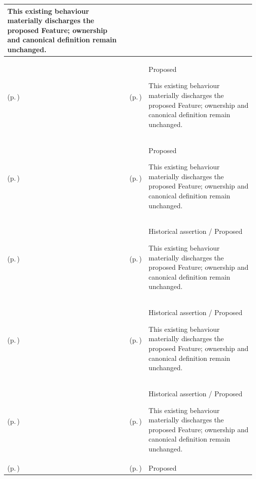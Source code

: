 \begin{longtable}{|>{\raggedright\arraybackslash}p{0.27\TableWidth}|>{\raggedright\arraybackslash}p{0.27\TableWidth}|>{\raggedright\arraybackslash}p{0.46\TableWidth}|}
This existing behaviour materially discharges the proposed Feature; ownership and canonical definition remain unchanged.\\\hline
\nameref{function:design-service-assurance} (p.\,\pageref{function:design-service-assurance}) & \nameref{feature:assurance-disposition-design-modelling} (p.\,\pageref{feature:assurance-disposition-design-modelling}) & Proposed

This existing behaviour materially discharges the proposed Feature; ownership and canonical definition remain unchanged.\\\hline
\nameref{function:manage-assurance-criteria} (p.\,\pageref{function:manage-assurance-criteria}) & \nameref{feature:temporal-assurance-criteria-stewardship} (p.\,\pageref{feature:temporal-assurance-criteria-stewardship}) & Proposed

This existing behaviour materially discharges the proposed Feature; ownership and canonical definition remain unchanged.\\\hline
\nameref{function:establish-assurance-context} (p.\,\pageref{function:establish-assurance-context}) & \nameref{feature:independent-evidence-assessment-adjudication} (p.\,\pageref{feature:independent-evidence-assessment-adjudication}) & Historical assertion / Proposed

This existing behaviour materially discharges the proposed Feature; ownership and canonical definition remain unchanged.\\\hline
\nameref{function:assess-assurance-evidence} (p.\,\pageref{function:assess-assurance-evidence}) & \nameref{feature:independent-evidence-assessment-adjudication} (p.\,\pageref{feature:independent-evidence-assessment-adjudication}) & Historical assertion / Proposed

This existing behaviour materially discharges the proposed Feature; ownership and canonical definition remain unchanged.\\\hline
\nameref{function:adjudicate-assurance-assessment} (p.\,\pageref{function:adjudicate-assurance-assessment}) & \nameref{feature:independent-evidence-assessment-adjudication} (p.\,\pageref{feature:independent-evidence-assessment-adjudication}) & Historical assertion / Proposed

This existing behaviour materially discharges the proposed Feature; ownership and canonical definition remain unchanged.\\\hline
\nameref{function:manage-clinic-practice-capacity} (p.\,\pageref{function:manage-clinic-practice-capacity}) & \nameref{feature:clinic-session-capacity-management} (p.\,\pageref{feature:clinic-session-capacity-management}) & Proposed


\end{longtable}
